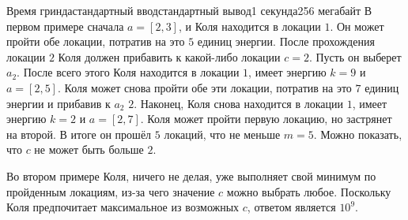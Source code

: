 \begin{problem}{Время гринда}{стандартный ввод}{стандартный вывод}{1 секунда}{256 мегабайт}
\Note
В первом примере сначала $a = [2, 3]$, и Коля находится в локации $1$. Он может пройти обе локации, потратив на это $5$ единиц энергии. После прохождения локации $2$ Коля должен прибавить к какой-либо локации $c = 2$. Пусть он выберет $a_2$. После всего этого Коля находится в локации $1$, имеет энергию $k = 9$ и $a = [2, 5]$. Коля может снова пройти обе эти локации, потратив на это $7$ единиц энергии и прибавив к $a_2$ $2$. Наконец, Коля снова находится в локации $1$, имеет энергию $k = 2$ и $a = [2, 7]$. Коля может пройти первую локацию, но застрянет на второй. В итоге он прошёл $5$ локаций, что не меньше  $m = 5$. Можно показать, что $c$ не может быть больше $2$.

Во втором примере Коля, ничего не делая, уже выполняет свой минимум по пройденным локациям, из-за чего значение $c$ можно выбрать любое. Поскольку Коля предпочитает максимальное из возможных $c$, ответом является $10^9$.

\end{problem}

